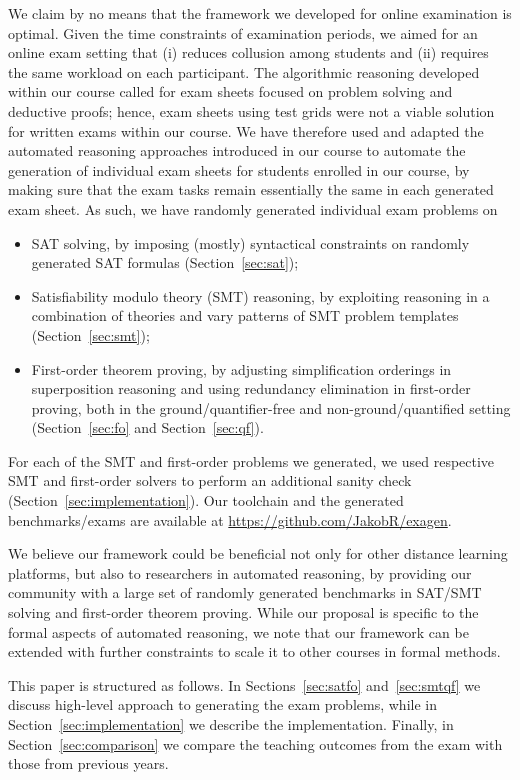 We claim by no means that the framework we developed for online
examination is optimal.
Given the time constraints of examination periods, we aimed for an
online exam setting that (i) reduces collusion among students and  (ii)
requires the same workload on each participant.
The algorithmic reasoning developed within our
course called for exam sheets focused on problem solving and deductive
proofs; hence, exam sheets using test grids were not a viable solution
for written exams within our course.
We have therefore used and adapted the automated reasoning approaches introduced in our
course to automate the generation of individual exam sheets for
students enrolled in our course, by making sure that the exam tasks
remain essentially the same in each generated exam sheet. As such, we have randomly generated
individual exam problems on 
\begin{itemize}
\item
    SAT solving, by imposing (mostly) syntactical constraints on
    randomly generated SAT formulas (Section~\ref{sec:sat});
\item Satisfiability modulo theory (SMT) reasoning, by exploiting reasoning in a combination of theories
  and vary patterns of SMT problem templates (Section~\ref{sec:smt}); 
\item First-order theorem proving, by adjusting simplification
  orderings in superposition reasoning and using redundancy elimination
  in first-order proving, both in the ground/quantifier-free 
  and non-ground/quantified setting (Section~\ref{sec:fo}
  and Section~\ref{sec:qf}). 
\end{itemize}
For each of the SMT and first-order problems we generated, we used respective
SMT and first-order solvers to perform an additional sanity check
(Section~\ref{sec:implementation}).
Our toolchain and the generated benchmarks/exams are available at \url{https://github.com/JakobR/exagen}.

We believe our framework could be beneficial not only for other
distance learning platforms, but also to researchers in automated
reasoning, by providing our community with a large set of randomly generated benchmarks in SAT/SMT solving and first-order theorem proving.
While our proposal is specific to the formal aspects of automated
reasoning, we note that  our framework can be extended with further
constraints to scale it to other courses in formal methods. 

This paper is structured as follows. In Sections~\ref{sec:satfo} and~\ref{sec:smtqf}
we discuss high-level approach to generating the exam problems,
while in Section~\ref{sec:implementation}
we describe the implementation. Finally, in Section~\ref{sec:comparison} we compare
the teaching outcomes from the exam with those from previous years.
